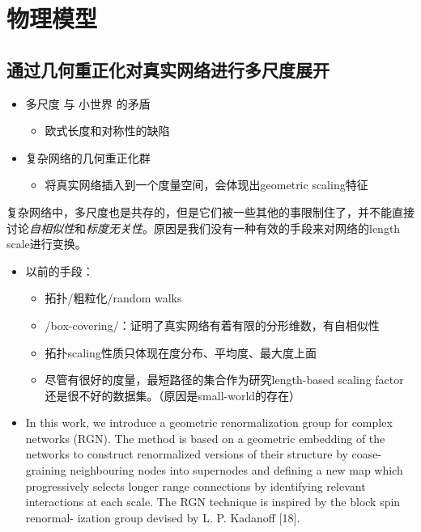 \chapter{物理模型}

\section{通过几何重正化对真实网络进行多尺度展开}

\begin{itemize}
\item
  多尺度 与 小世界 的矛盾

  \begin{itemize}
  \item
    欧式长度和对称性的缺陷
  \end{itemize}
\item
  复杂网络的几何重正化群

  \begin{itemize}
  \item
    将真实网络插入到一个度量空间，会体现出geometric scaling特征
  \end{itemize}
\end{itemize}

复杂网络中，多尺度也是共存的，但是它们被一些其他的事限制住了，并不能直接讨论\emph{自相似性}和\emph{标度无关性}。原因是我们没有一种有效的手段来对网络的length
scale进行变换。

\begin{itemize}
\item
  以前的手段：

  \begin{itemize}
  \item
    拓扑/粗粒化/random walks
  \item
    /box-covering/：证明了真实网络有着有限的分形维数，有自相似性
  \item
    拓扑scaling性质只体现在度分布、平均度、最大度上面
  \item
    尽管有很好的度量，最短路径的集合作为研究length-based scaling
    factor还是很不好的数据集。（原因是small-world的存在）
  \end{itemize}
\item
  In this work, we introduce a geometric renormalization group for
  complex networks (RGN). The method is based on a geometric embedding
  of the networks to construct renormalized versions of their structure
  by coase-graining neighbouring nodes into supernodes and defining a
  new map which progressively selects longer range connections by
  identifying relevant interactions at each scale. The RGN technique is
  inspired by the block spin renormal- ization group devised by L. P.
  Kadanoff {[}18{]}.
\end{itemize}

